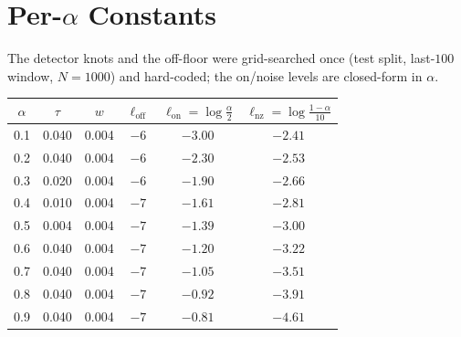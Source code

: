 \documentclass[11pt]{article}
\begin{document}
\section{Per-$\alpha$ Constants}
The detector knots and the off-floor were grid-searched once (test split, last-$100$ window,
$N{=}1000$) and hard-coded; the on/noise levels are closed-form in $\alpha$.
\begin{center}\small
\begin{tabular}{@{}cccccc@{}}
\toprule
$\alpha$ & $\tau$ & $w$ & $\ell_{\mathrm{off}}$ & $\ell_{\mathrm{on}}=\log\frac{\alpha}{2}$ & $\ell_{\mathrm{nz}}=\log\frac{1-\alpha}{10}$\\
\midrule
0.1 & 0.040 & 0.004 & $-6$ & $-3.00$ & $-2.41$\\
0.2 & 0.040 & 0.004 & $-6$ & $-2.30$ & $-2.53$\\
0.3 & 0.020 & 0.004 & $-6$ & $-1.90$ & $-2.66$\\
0.4 & 0.010 & 0.004 & $-7$ & $-1.61$ & $-2.81$\\
0.5 & 0.004 & 0.004 & $-7$ & $-1.39$ & $-3.00$\\
0.6 & 0.040 & 0.004 & $-7$ & $-1.20$ & $-3.22$\\
0.7 & 0.040 & 0.004 & $-7$ & $-1.05$ & $-3.51$\\
0.8 & 0.040 & 0.004 & $-7$ & $-0.92$ & $-3.91$\\
0.9 & 0.040 & 0.004 & $-7$ & $-0.81$ & $-4.61$\\
\bottomrule
\end{tabular}
\end{center}

\end{document}

